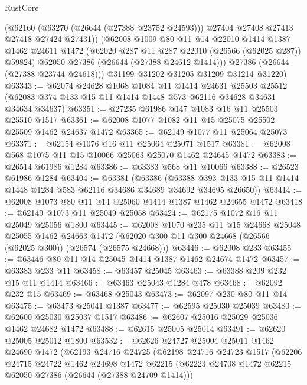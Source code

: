 \begin{lexlean}{RustCore}
\begin{coremodule}
          (@62160
            (@63270 (@26644 (@27388 @23752 @24593)))
            @27404
            @27408
            @27413
            @27418
            @27424
            @27431))
        (@62008
          @1009
          @80
          @11
          @14
          @22010
          @1414
          @1387
          @1462
          @24611
          @1472
          (@62020 @287 @11 @287 @22010 (@26566 (@62025 @287)) @59824)
          @62050
          @27386
          (@26644 (@27388 @24612 @1414)))
        @27386
        (@26644 (@27388 @23744 @24618)))
      @31199
      @31202
      @31205
      @31209
      @31214
      @31220)
@63343 := @62074
    @24628
    @1068
    @1084
    @11
    @1414
    @24631
    @25503
    @25512
    (@62083 @374 @133 @15 @11 @1414 @1448 @573 @62116 @34628 @34631 @34634 @34637)
@63351 := @27235 @61986 @147 @1083 @16 @11 @25503 @25510 @1517
@63361 := @62008 @1077 @1082 @11 @15 @25075 @25502 @25509 @1462 @24637 @1472
@63365 := @62149 @1077 @11 @25064 @25073
@63371 := @62154 @1076 @16 @11 @25064 @25071 @1517
@63381 := @62008 @568 @1075 @11 @15 @10066 @25063 @25070 @1462 @24645 @1472
@63383 := @26514 @61986 @1284
@63386 := @63383 @568 @11 @10066
@63388 := @26523 @61986 @1284
@63404 := @63381
    (@63386
      (@63388 @393 @133 @15 @11 @1414 @1448 @1284 @583 @62116 @34686 @34689 @34692 @34695 @26650))
@63414 := @62008 @1073 @80 @11 @14 @25060 @1414 @1387 @1462 @24655 @1472
@63418 := @62149 @1073 @11 @25049 @25058
@63424 := @62175 @1072 @16 @11 @25049 @25056 @1800
@63445 := @62008
    @1070
    @235
    @11
    @15
    @24668
    @25048
    @25055
    @1462
    @24663
    @1472
    (@62020 @300 @11 @300 @24668 (@26566 (@62025 @300)) (@26574 (@26575 @24668)))
@63446 := @62008 @233
@63455 := @63446 @80 @11 @14 @25045 @1414 @1387 @1462 @24674 @1472
@63457 := @63383 @233 @11
@63458 := @63457 @25045
@63463 := @63388 @209 @232 @15 @11 @1414
@63466 := @63463 @25043 @1284 @478
@63468 := @62092 @232 @15
@63469 := @63468 @25043
@63473 := @62097 @230 @80 @11 @14
@63475 := @63473 @25041 @1387
@63477 := @62595 @25030 @25039
@63480 := @62600 @25030 @25037 @1517
@63486 := @62607 @25016 @25029 @25036 @1462 @24682 @1472
@63488 := @62615 @25005 @25014
@63491 := @62620 @25005 @25012 @1800
@63532 := @62626
    @24727
    @25004
    @25011
    @1462
    @24690
    @1472
    (@62193
      @24716
      @24725
      (@62198
        @24716
        @24723
        @1517
        (@62206
          @24715
          @24722
          @1462
          @24698
          @1472
          @62215
          (@62223 @24708 @1472 @62215 @62050 @27386 (@26644 (@27388 @24709 @1414)))

\end{coremodule}
\end{lexlean}
